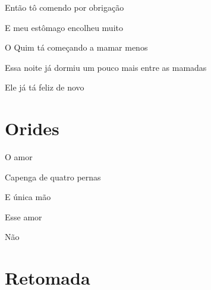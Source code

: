 {Então tô comendo por obrigação

E meu estômago encolheu muito

O Quim tá começando a mamar menos

Essa noite já dormiu um pouco mais entre as mamadas

Ele já tá feliz de novo


\chapter{Orides}\label{orides}

O amor

Capenga de quatro pernas

E única mão

Esse amor

Não
}




\chapter{Retomada}

